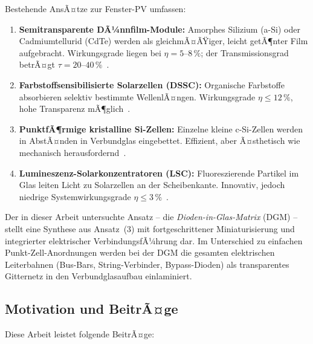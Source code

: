 ﻿\documentclass[a4paper,12pt]{article}
\theoremstyle{definition}
\theoremstyle{remark}
\begin{document}
Bestehende AnsÃ¤tze zur Fenster-PV umfassen:
\begin{enumerate}
  \item \textbf{Semitransparente DÃ¼nnfilm-Module:} Amorphes Silizium (a-Si)
    oder Cadmiumtellurid (CdTe) werden als gleichmÃ¤ÃŸiger, leicht getÃ¶nter Film
    aufgebracht. Wirkungsgrade liegen bei $\eta = 5$--$8\,\%$; der
    Transmissionsgrad betrÃ¤gt $\tau = 20$--$40\,\%$~\cite{Cannavale2020}.

  \item \textbf{Farbstoffsensibilisierte Solarzellen (DSSC):} Organische
    Farbstoffe absorbieren selektiv bestimmte WellenlÃ¤ngen.
    Wirkungsgrade $\eta \le 12\,\%$, hohe Transparenz mÃ¶glich~\cite{Koerner2015}.

  \item \textbf{PunktfÃ¶rmige kristalline Si-Zellen:} Einzelne kleine
    c-Si-Zellen werden in AbstÃ¤nden in Verbundglas eingebettet. Effizient,
    aber Ã¤sthetisch wie mechanisch herausfordernd~\cite{Weller2014}.

  \item \textbf{Lumineszenz-Solarkonzentratoren (LSC):} Fluoreszierende
    Partikel im Glas leiten Licht zu Solarzellen an der Scheibenkante.
    Innovativ, jedoch niedrige Systemwirkungsgrade $\eta \le 3\,\%$~\cite{Brovelli2022}.
\end{enumerate}

Der in dieser Arbeit untersuchte Ansatz -- die \emph{Dioden-in-Glas-Matrix}
(DGM) -- stellt eine Synthese aus Ansatz~(3) mit fortgeschrittener
Miniaturisierung und integrierter elektrischer VerbindungsfÃ¼hrung dar. Im
Unterschied zu einfachen Punkt-Zell-Anordnungen werden bei der DGM die
gesamten elektrischen Leiterbahnen (Bus-Bars, String-Verbinder, Bypass-Dioden)
als transparentes Gitternetz in den Verbundglasaufbau einlaminiert.

\subsection{Motivation und BeitrÃ¤ge}

Diese Arbeit leistet folgende BeitrÃ¤ge:
\end{document}

